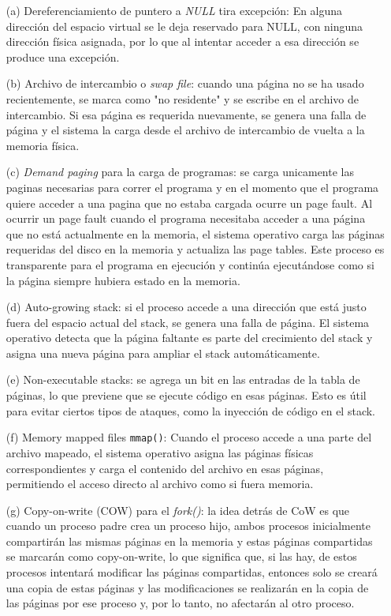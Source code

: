 \documentclass[12pt]{article}
\begin{document}
\begin{rta}
    \begin{itemize}
        \item[(a)] Dereferenciamiento de puntero a \textit{NULL} tira excepción: En alguna dirección del espacio virtual se le deja reservado para NULL, con ninguna dirección física asignada, por lo que al intentar acceder a esa dirección se produce una excepción.
        \item[(b)] Archivo de intercambio o \textit{swap file}: cuando una página no se ha usado recientemente, se marca como "no residente" y se escribe en el archivo de intercambio. Si esa página es requerida nuevamente, se genera una falla de página y el sistema la carga desde el archivo de intercambio de vuelta a la memoria física.
        \item[(c)] \textit{Demand paging} para la carga de programas: se carga unicamente las paginas necesarias para correr el programa y en el momento que el programa quiere acceder a una pagina que no estaba cargada ocurre un page fault.
        Al ocurrir un page fault cuando el programa necesitaba acceder a una página que no está actualmente en la memoria, el sistema operativo carga las páginas requeridas del disco en la memoria y actualiza las page tables. Este proceso es transparente para el programa en ejecución y continúa ejecutándose como si la página siempre hubiera estado en la memoria.  
        \item[(d)] Auto-growing stack:  si el proceso accede a una dirección que está justo fuera del espacio actual del stack, se genera una falla de página. El sistema operativo detecta que la página faltante es parte del crecimiento del stack y asigna una nueva página para ampliar el stack automáticamente.
        \item[(e)] Non-executable stacks: se agrega un bit en las entradas de la tabla de páginas, lo que previene que se ejecute código en esas páginas. Esto es útil para evitar ciertos tipos de ataques, como la inyección de código en el stack.
        \item[(f)] Memory mapped files \texttt{mmap()}: Cuando el proceso accede a una parte del archivo mapeado, el sistema operativo asigna las páginas físicas correspondientes y carga el contenido del archivo en esas páginas, permitiendo el acceso directo al archivo como si fuera memoria.
        \item[(g)] Copy-on-write (COW) para el \textit{fork()}: la idea detrás de CoW es que cuando un proceso padre crea un proceso hijo, ambos procesos inicialmente compartirán las mismas páginas en la memoria y estas páginas compartidas se marcarán como copy-on-write, lo que significa que, si las hay, de estos procesos intentará modificar las páginas compartidas, entonces solo se creará una copia de estas páginas y las modificaciones se realizarán en la copia de las páginas por ese proceso y, por lo tanto, no afectarán al otro proceso.  

\end{itemize}
\end{rta}
\end{document}
